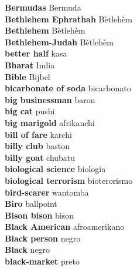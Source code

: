 \textbf{ Bermudas  } Bermuda \\
\textbf{ Bethlehem Ephrathah  } Bètlehèm \\
\textbf{ Bethlehem  } Bètlehèm \\
\textbf{ Bethlehem-Judah  } Bètlehèm \\
\textbf{ better half  } kasa \\
\textbf{ Bharat  } India \\
\textbf{ Bible  } Bijbel \\
\textbf{ bicarbonate of soda  } bicarbonato \\
\textbf{ big businessman  } baron \\
\textbf{ big cat  } pushi \\
\textbf{ big marigold  } afrikanchi \\
\textbf{ bill of fare  } karchi \\
\textbf{ billy club  } baston \\
\textbf{ billy goat  } chubatu \\
\textbf{ biological science  } biologia \\
\textbf{ biological terrorism  } bioterorismo \\
\textbf{ bird-scarer  } wantomba \\
\textbf{ Biro  } ballpoint \\
\textbf{ Bison bison  } bison \\
\textbf{ Black American  } afroamerikano \\
\textbf{ Black person  } negro \\
\textbf{ Black  } negro \\
\textbf{ black-market  } preto \\
